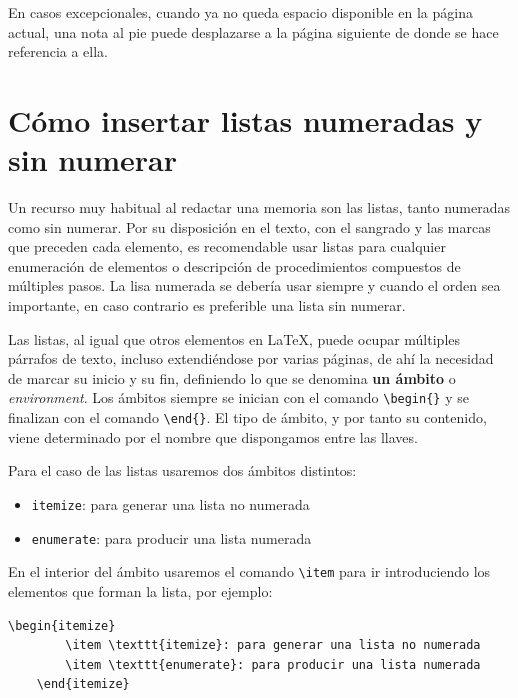 En casos excepcionales, cuando ya no queda espacio disponible en la página actual, una nota al pie puede desplazarse a la página siguiente de donde se hace referencia a ella.

\section{Cómo insertar listas numeradas y sin numerar}

Un recurso muy habitual al redactar una memoria son las listas, tanto numeradas como sin numerar. Por su disposición en el texto, con el sangrado y las marcas que preceden cada elemento, es recomendable usar listas para cualquier enumeración de elementos o descripción de procedimientos compuestos de múltiples pasos. La lisa numerada se debería usar siempre y cuando el orden sea importante, en caso contrario es preferible una lista sin numerar.

Las listas, al igual que otros elementos en \LaTeX, puede ocupar múltiples párrafos de texto, incluso extendiéndose por varias páginas, de ahí la necesidad de marcar su inicio y su fin, definiendo lo que se denomina \textbf{un ámbito} o \textit{environment}. Los ámbitos siempre se inician con el comando \verb|\begin{}| y se finalizan con el comando \verb|\end{}|. El tipo de ámbito, y por tanto su contenido, viene determinado por el nombre que dispongamos entre las llaves.

Para el caso de las listas usaremos dos ámbitos distintos:
\begin{itemize}
    \item \verb|itemize|: para generar una lista no numerada
    \item \verb|enumerate|: para producir una lista numerada
\end{itemize}

En el interior del ámbito usaremos el comando \verb|\item| para ir introduciendo los elementos que forman la lista, por ejemplo:

\begin{lstlisting}[language={[LaTeX]TeX},caption={Creación de una lista no numerada con dos elementos},label=List.Itemize]
    \begin{itemize}
        \item \texttt{itemize}: para generar una lista no numerada
        \item \texttt{enumerate}: para producir una lista numerada
    \end{itemize}
\end{lstlisting}

